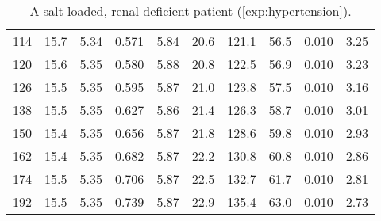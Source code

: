 \begin{table}
\begin{tabular}{cccccccccc}
    114 & 15.7 & 5.34 & 0.571 & 5.84 & 20.6 & 121.1 & 56.5 & 0.010 & 3.25 \\
    120 & 15.6 & 5.35 & 0.580 & 5.88 & 20.8 & 122.5 & 56.9 & 0.010 & 3.23 \\
    126 & 15.5 & 5.35 & 0.595 & 5.87 & 21.0 & 123.8 & 57.5 & 0.010 & 3.16 \\
    138 & 15.5 & 5.35 & 0.627 & 5.86 & 21.4 & 126.3 & 58.7 & 0.010 & 3.01 \\
    150 & 15.4 & 5.35 & 0.656 & 5.87 & 21.8 & 128.6 & 59.8 & 0.010 & 2.93 \\
    162 & 15.4 & 5.35 & 0.682 & 5.87 & 22.2 & 130.8 & 60.8 & 0.010 & 2.86 \\
    174 & 15.5 & 5.35 & 0.706 & 5.87 & 22.5 & 132.7 & 61.7 & 0.010 & 2.81 \\
    192 & 15.5 & 5.35 & 0.739 & 5.87 & 22.9 & 135.4 & 63.0 & 0.010 & 2.73 \\
    \bottomrule
  \end{tabular}
  \caption{A salt loaded, renal deficient patient (\autoref{exp:hypertension}).}
  \label{tbl:hypertension}
\end{table}
